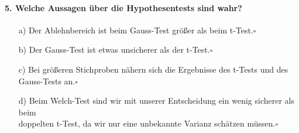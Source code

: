 \documentclass[a4paper]{article}
\begin{document}
 \paragraph{5. Welche Aussagen über die Hypothesentests sind wahr?} \begin{itemize}
    \item[a)]Der Ablehnbereich ist  beim Gauss-Test größer als beim t-Test.\hfill $\square$
    \item[b)]Der Gauss-Test ist etwas unsicherer als der t-Test.\hfill $\square$
    \item[c)]Bei größeren Stichproben nähern sich die Ergebnisse des t-Tests und des Gauss-Tests an.\hfill $\square$
    \item[d)] Beim Welch-Test sind wir mit unserer Entscheidung ein wenig sicherer als beim \\doppelten t-Test, da wir nur eine unbekannte Varianz schätzen müssen.\hfill $\square$
 \end{itemize}  


\clearpage

\end{document}
